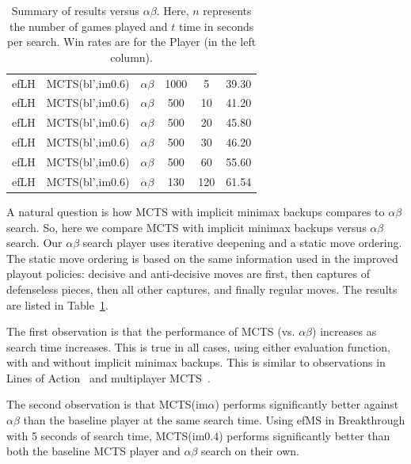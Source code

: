 \documentclass[conference]{IEEEtran}
\begin{document}
\begin{table}[t]
\begin{center}
\begin{tabular}{ccccc|c}
efLH       & MCTS(bl',im$0.6$)     & $\alpha\beta$    & 1000   & 5       & 39.30      \\     
efLH       & MCTS(bl',im$0.6$)     & $\alpha\beta$    &  500   & 10      & 41.20      \\     
efLH       & MCTS(bl',im$0.6$)     & $\alpha\beta$    &  500   & 20      & 45.80      \\     
efLH       & MCTS(bl',im$0.6$)     & $\alpha\beta$    &  500   & 30      & 46.20      \\     
efLH       & MCTS(bl',im$0.6$)     & $\alpha\beta$    &  500   & 60      & 55.60      \\     
efLH       & MCTS(bl',im$0.6$)     & $\alpha\beta$    &  130   & 120     & 61.54      \\     
\hline
\end{tabular}
\end{center}
\caption{Summary of results versus $\alpha\beta$. 
Here, $n$ represents the number of games played and $t$ time in seconds per search.
Win rates are for the Player (in the left column).}
\label{tbl:ab_vs_mcts}
\end{table}

A natural question is how MCTS with implicit minimax backups compares to $\alpha\beta$ search. 
So, here we compare MCTS with implicit minimax backups versus $\alpha\beta$ search.
Our $\alpha\beta$ search player uses iterative deepening and a static move ordering. 
The static move ordering is based on the same information used in the improved playout
policies: decisive and anti-decisive moves are first, then captures of defenseless pieces, 
then all other captures, and finally regular moves.
The results are listed in Table~\ref{tbl:ab_vs_mcts}.

The first observation is that the performance of MCTS (vs. $\alpha\beta$) 
increases as search time increases. This is true in all cases, using either evaluation function, 
with and without implicit minimax backups. This is similar to observations in 
Lines of Action~\cite{Winands11AB} and multiplayer MCTS~\cite{Nijssen13,Sturtevant08icga}.

The second observation is that MCTS(im$\alpha$) performs significantly better 
against $\alpha\beta$ than the baseline player at the same search time. 
Using efMS in Breakthrough with 5 seconds of search time, MCTS(im$0.4$) performs significantly 
better than both the baseline MCTS player and $\alpha\beta$ search on their own. 
\end{document}
